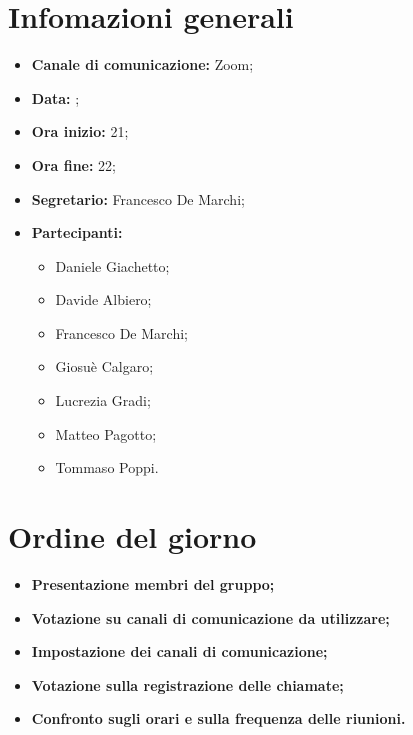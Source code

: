 \section{Infomazioni generali}

\begin{itemize}

	\item \textbf{Canale di comunicazione:} Zoom;
	
	\item \textbf{Data:} \DataMeeting{};
	
	\item \textbf{Ora inizio:} 21;
	
	\item \textbf{Ora fine:} 22;
	
	\item \textbf{Segretario:} Francesco De Marchi;
	
	\item \textbf{Partecipanti:}
	
		\begin{itemize}
		
			\item Daniele Giachetto;
			\item Davide Albiero;
			\item Francesco De Marchi;
			\item Giosuè Calgaro;
			\item Lucrezia Gradi;
			\item Matteo Pagotto;
			\item Tommaso Poppi.
				 
		\end{itemize}

\end{itemize}

\section{Ordine del giorno}

\begin{itemize}

	\item\textbf{ Presentazione membri del gruppo;}

	\item\textbf{ Votazione su canali di comunicazione da utilizzare;}

	\item\textbf{ Impostazione dei canali di comunicazione;}

	\item\textbf{ Votazione sulla registrazione delle chiamate;}

	\item\textbf{ Confronto sugli orari e sulla frequenza delle riunioni.}


\end{itemize}
\newpage

